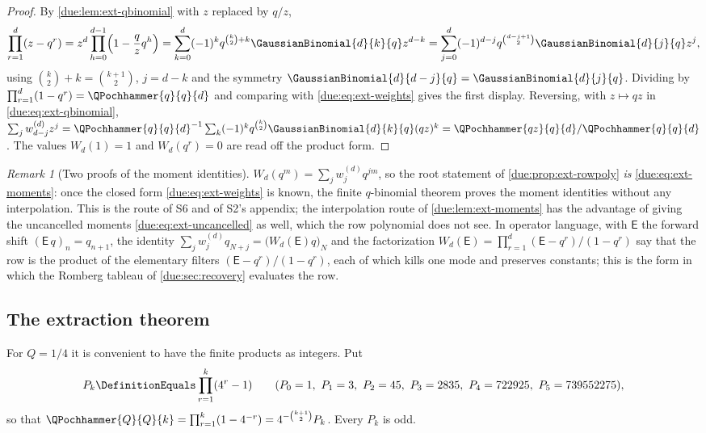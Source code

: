 \documentclass[11pt,oneside]{article}
\theoremstyle{plain}
\theoremstyle{definition}
\theoremstyle{remark}
\newtheorem{remark}[theorem]{Remark}
\newcommand{\upn}[1]{\RvachevUp_{#1}}
\newcommand{\Qq}{Q}                                         %
\newcommand{\qn}[1]{q_{#1}}                                 %
\newcommand{\Wrow}[2]{w^{(#1)}_{#2}}                        %
\begin{document}
\begin{proof}
By \cref{due:lem:ext-qbinomial} with $z$ replaced by $q/z$,
\[
 \prod_{r=1}^{d}(z-q^{r})
 =z^{d}\prod_{h=0}^{d-1}\Bigl(1-\frac{q}{z}q^{h}\Bigr)
 =\sum_{k=0}^{d}(-1)^{k}q^{\binom{k}{2}+k}\GaussianBinomial{d}{k}{q}z^{d-k}
 =\sum_{j=0}^{d}(-1)^{d-j}q^{\binom{d-j+1}{2}}\GaussianBinomial{d}{j}{q}z^{j},
\]
using $\binom{k}{2}+k=\binom{k+1}{2}$, $j=d-k$ and the symmetry
$\GaussianBinomial{d}{d-j}{q}=\GaussianBinomial{d}{j}{q}$.  Dividing by
$\prod_{r=1}^{d}(1-q^{r})=\QPochhammer{q}{q}{d}$ and comparing with
\cref{due:eq:ext-weights} gives the first display.  Reversing, with
$z\mapsto qz$ in \cref{due:eq:ext-qbinomial},
$\sum_{j}\Wrow{d}{d-j}z^{j}
=\QPochhammer{q}{q}{d}^{-1}\sum_{k}(-1)^{k}q^{\binom{k}{2}}
 \GaussianBinomial{d}{k}{q}(qz)^{k}
=\QPochhammer{qz}{q}{d}/\QPochhammer{q}{q}{d}$.
The values $W_{d}(1)=1$ and $W_{d}(q^{r})=0$ are read off the product form.
\end{proof}

\begin{remark}[Two proofs of the moment identities]
\label{due:rmk:ext-tworoutes}
$W_{d}(q^{m})=\sum_{j}\Wrow{d}{j}q^{jm}$, so the root statement of
\cref{due:prop:ext-rowpoly} \emph{is} \cref{due:eq:ext-moments}: once the
closed form \cref{due:eq:ext-weights} is known, the finite $q$-binomial
theorem proves the moment identities without any interpolation.  This is the
route of S6 and of S2's appendix; the interpolation route of
\cref{due:lem:ext-moments} has the advantage of giving the uncancelled
moments \cref{due:eq:ext-uncancelled} as well, which the row polynomial does
not see.  In operator language, with $\mathsf E$ the forward shift
$(\mathsf E\,q)_{n}=\qn{n+1}$, the identity
$\sum_{j}\Wrow{d}{j}\qn{N+j}=\bigl(W_{d}(\mathsf E)q\bigr)_{N}$ and the
factorization $W_{d}(\mathsf E)=\prod_{r=1}^{d}(\mathsf E-q^{r})/(1-q^{r})$
say that the row is the product of the elementary filters
$(\mathsf E-q^{r})/(1-q^{r})$, each of which kills one mode and preserves
constants; this is the form in which the Romberg tableau of
\cref{due:sec:recovery} evaluates the row.
\end{remark}

\subsection{The extraction theorem}

For $\Qq=1/4$ it is convenient to have the finite products as integers.  Put
\begin{equation}
 P_{k}\DefinitionEquals\prod_{r=1}^{k}(4^{r}-1)
 \qquad(P_{0}=1,\ P_{1}=3,\ P_{2}=45,\ P_{3}=2835,\ P_{4}=722925,\
 P_{5}=739552275),
 \label{due:eq:ext-Pk}
\end{equation}
so that $\QPochhammer{\Qq}{\Qq}{k}=\prod_{r=1}^{k}(1-4^{-r})
=4^{-\binom{k+1}{2}}P_{k}$.  Every $P_{k}$ is odd.
\end{document}
